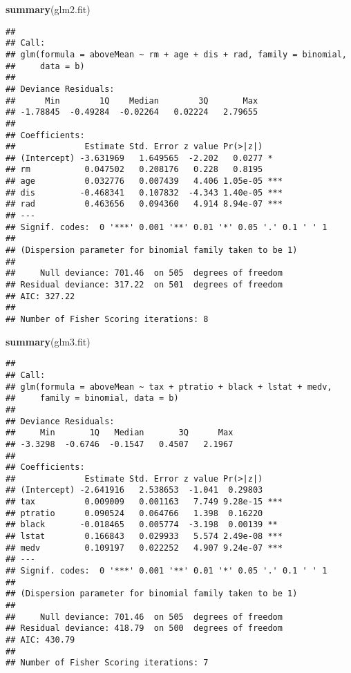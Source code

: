\documentclass[]{article}
\newenvironment{Shaded}{\begin{snugshade}}{\end{snugshade}}
\newcommand{\KeywordTok}[1]{\textcolor[rgb]{0.13,0.29,0.53}{\textbf{#1}}}
\newcommand{\NormalTok}[1]{#1}
\begin{document}
\begin{Shaded}
\begin{Highlighting}[]
\KeywordTok{summary}\NormalTok{(glm2.fit)}
\end{Highlighting}
\end{Shaded}

\begin{verbatim}
## 
## Call:
## glm(formula = aboveMean ~ rm + age + dis + rad, family = binomial, 
##     data = b)
## 
## Deviance Residuals: 
##      Min        1Q    Median        3Q       Max  
## -1.78845  -0.49284  -0.02264   0.02224   2.79655  
## 
## Coefficients:
##              Estimate Std. Error z value Pr(>|z|)    
## (Intercept) -3.631969   1.649565  -2.202   0.0277 *  
## rm           0.047502   0.208176   0.228   0.8195    
## age          0.032776   0.007439   4.406 1.05e-05 ***
## dis         -0.468341   0.107832  -4.343 1.40e-05 ***
## rad          0.463656   0.094360   4.914 8.94e-07 ***
## ---
## Signif. codes:  0 '***' 0.001 '**' 0.01 '*' 0.05 '.' 0.1 ' ' 1
## 
## (Dispersion parameter for binomial family taken to be 1)
## 
##     Null deviance: 701.46  on 505  degrees of freedom
## Residual deviance: 317.22  on 501  degrees of freedom
## AIC: 327.22
## 
## Number of Fisher Scoring iterations: 8
\end{verbatim}

\begin{Shaded}
\begin{Highlighting}[]
\KeywordTok{summary}\NormalTok{(glm3.fit)}
\end{Highlighting}
\end{Shaded}

\begin{verbatim}
## 
## Call:
## glm(formula = aboveMean ~ tax + ptratio + black + lstat + medv, 
##     family = binomial, data = b)
## 
## Deviance Residuals: 
##     Min       1Q   Median       3Q      Max  
## -3.3298  -0.6746  -0.1547   0.4507   2.1967  
## 
## Coefficients:
##              Estimate Std. Error z value Pr(>|z|)    
## (Intercept) -2.641916   2.538653  -1.041  0.29803    
## tax          0.009009   0.001163   7.749 9.28e-15 ***
## ptratio      0.090524   0.064766   1.398  0.16220    
## black       -0.018465   0.005774  -3.198  0.00139 ** 
## lstat        0.166843   0.029933   5.574 2.49e-08 ***
## medv         0.109197   0.022252   4.907 9.24e-07 ***
## ---
## Signif. codes:  0 '***' 0.001 '**' 0.01 '*' 0.05 '.' 0.1 ' ' 1
## 
## (Dispersion parameter for binomial family taken to be 1)
## 
##     Null deviance: 701.46  on 505  degrees of freedom
## Residual deviance: 418.79  on 500  degrees of freedom
## AIC: 430.79
## 
## Number of Fisher Scoring iterations: 7
\end{verbatim}
\end{document}
